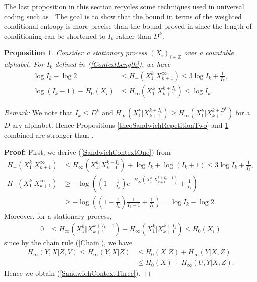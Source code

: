 \documentclass[a4paper,12pt]{article}
\newcommand{\okra}[1]{\left( #1 \right)}
\newtheorem{proposition}{Proposition}
\newenvironment*{proof}{\begin{trivlist}\item[]
\noindent\textbf{Proof:}}{$\Box$\par\end{trivlist}}
\begin{document}
The last proposition in this section recycles some techniques used in
universal coding such as \citep[Theorem 6.11]{Debowski21}. The goal is
to show that the bound in terms of the weighted conditional entropy is
more precise than the bound proved in \citep[Theorem 8]{Debowski18b}
since the length of conditioning can be shortened to $I_k$ rather than
$D^k$.
\begin{proposition}
  \label{theoSandwichContext}
  Consider a stationary process $(X_i)_{i\in\mathbb{Z}}$ over a
  countable alphabet.  For $I_k$ defined in (\ref{ContextLength}), we
  have
\begin{align}
  \label{SandwichContextOne}
  \log I_k-\log 2&\le H_-(X_1^k|X_{k+1}^\infty)\le
  3\log I_k+\frac{1}{I_k}
  ,
  \\
  \label{SandwichContextThree}
  \log (I_k-1)-H_0(X_i)&\le H_\infty(X_1^k|X_{k+1}^{k+I_k})\le \log I_k
                              .
\end{align}
\end{proposition}
\emph{Remark:} We note that $I_k\le D^k$ and
$H_\infty(X_1^k|X_{k+1}^{k+I_k})\ge H_\infty(X_1^k|X_{k+1}^{k+D^k})$
for a $D$-ary alphabet. Hence Propositions
\ref{theoSandwichRepetitionTwo} and \ref{theoSandwichContext} combined
are stronger than \citep[Theorem 8]{Debowski18b}.
\begin{proof}
First, we derive (\ref{SandwichContextOne}) from
\begin{align}
  H_-(X_1^k|X_{k+1}^\infty)
  &\le
    H_\infty(X_1^k|X_{k+1}^{k+I_k})+\log I_k+\log (I_k+1)\le
    3\log I_k+\frac{1}{I_k},
  \\
  H_-(X_1^k|X_{k+1}^\infty)
  &\ge
    -\log\okra{\okra{1-\frac{1}{I_k}}e^{-H_\infty(X_1^k|X_{k+1}^{k+I_k-1})}
    +\frac{1}{I_k}}
    \nonumber\\
  &\ge -\log\okra{\okra{1-\frac{1}{I_k}}\frac{1}{I_k-1}+\frac{1}{I_k}}
    =\log I_k-\log 2.
\end{align}
Moreover, for a stationary process,
\begin{align}
  0
  &\le
    H_\infty(X_1^k|X_{k+1}^{k+I_k-1})-H_\infty(X_1^k|X_{k+1}^{k+I_k})\le
    H_0(X_i)
\end{align}
since by the chain rule (\ref{Chain}), we have
\begin{align}
  H_\infty(Y,X|Z,V)\le H_\infty(Y,X|Z)
  &\le H_0(X|Z)+H_\infty(Y|X,Z)
    \nonumber\\
  &\le H_0(X)+H_\infty(U,Y|X,Z). 
\end{align}
Hence we obtain (\ref{SandwichContextThree}).
\end{proof}
\end{document}
